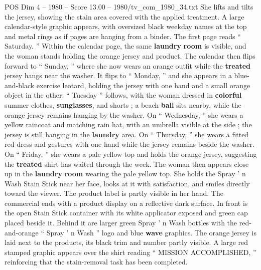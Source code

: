 \begin{textsample}{POS Dim 4 – 1980 – Score 13.00 – 1980/tv\_com\_1980\_34.txt}
She lifts and tilts the jersey, showing the stain area covered with the applied treatment.
A large calendar-style graphic appears, with oversized black weekday names at the top and metal rings as if pages are hanging from a binder.
The first page reads “ Saturday. ” Within the calendar page, the same \textbf{laundry} \textbf{room} is visible, and the woman stands holding the orange jersey and product.
The calendar then flips forward to “ Sunday, ” where she now wears an orange outfit while the \textbf{treated} jersey hangs near the washer.
It flips to “ Monday, ” and she appears in a blue-and-black exercise leotard, holding the jersey with one hand and a small orange object in the other. “ Tuesday ” follows, with the woman dressed in \textbf{colorful} summer clothes, \textbf{sunglasses}, and shorts ; a beach \textbf{ball} sits nearby, while the orange jersey remains hanging by the washer.
On “ Wednesday, ” she wears a yellow raincoat and matching rain hat, with an umbrella visible at the side ; the jersey is still hanging in the \textbf{laundry} area.
On “ Thursday, ” she wears a fitted red dress and gestures with one hand while the jersey remains beside the washer.
On “ Friday, ” she wears a pale yellow top and holds the orange jersey, suggesting the \textbf{treated} shirt has waited through the week.
The woman then appears close up in the \textbf{laundry} \textbf{room} wearing the pale yellow top.
She holds the Spray ’ n Wash Stain Stick near her face, looks at it with satisfaction, and smiles directly toward the viewer.
The product label is partly visible in her hand.
The commercial ends with a product display on a reflective dark surface.
In front is the open Stain Stick container with its white applicator exposed and green cap placed beside it.
Behind it are larger green Spray ’ n Wash bottles with the red-and-orange “ Spray ’ n Wash ” logo and blue \textbf{wave} graphics.
The orange jersey is laid next to the products, its black trim and number partly visible.
A large red stamped graphic appears over the shirt reading “ MISSION ACCOMPLISHED, ” reinforcing that the stain-removal task has been completed.

\end{textsample}
